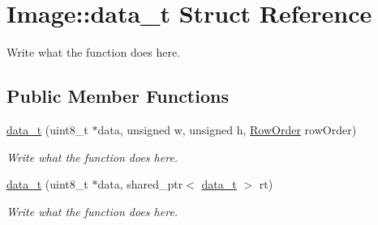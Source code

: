 \hypertarget{structImage_1_1data__t}{\section{Image\+:\+:data\+\_\+t Struct Reference}
\label{structImage_1_1data__t}
}


Write what the function does here.  


\subsection*{Public Member Functions}
\begin{DoxyCompactItemize}
\item 
\hyperlink{structImage_1_1data__t_ab3f0a7f8143399394e84c9c18e9b1619}{data\+\_\+t} (uint8\+\_\+t $\ast$data, unsigned w, unsigned h, \hyperlink{classImage_a856d0983e089ff127d0bcad3828c1aab}{Row\+Order} row\+Order)
\begin{DoxyCompactList}\small\item\em Write what the function does here. \end{DoxyCompactList}\item 
\hyperlink{structImage_1_1data__t_abedf51072a0d2354bd931200e8059b6f}{data\+\_\+t} (uint8\+\_\+t $\ast$data, shared\+\_\+ptr$<$ \hyperlink{structImage_1_1data__t}{data\+\_\+t} $>$ rt)
\begin{DoxyCompactList}\small\item\em Write what the function does here. \end{DoxyCompactList}\end{DoxyCompactItemize}
